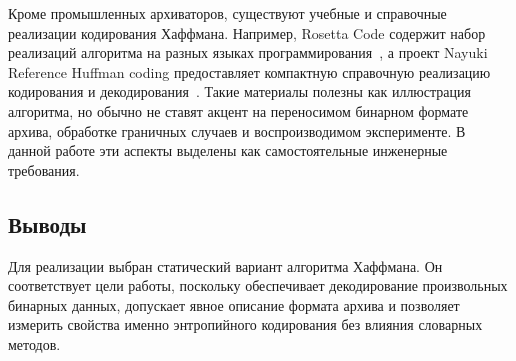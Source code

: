 Кроме промышленных архиваторов, существуют учебные и справочные реализации
кодирования Хаффмана. Например, Rosetta Code содержит набор реализаций
алгоритма на разных языках программирования~\cite{rosettahuffman}, а проект
Nayuki Reference Huffman coding предоставляет компактную справочную реализацию
кодирования и декодирования~\cite{nayukihuffman}. Такие материалы полезны как
иллюстрация алгоритма, но обычно не ставят акцент на переносимом бинарном
формате архива, обработке граничных случаев и воспроизводимом эксперименте. В
данной работе эти аспекты выделены как самостоятельные инженерные требования.

\subsection{Выводы}

Для реализации выбран статический вариант алгоритма Хаффмана. Он соответствует
цели работы, поскольку обеспечивает декодирование произвольных бинарных
данных, допускает явное описание формата архива и позволяет измерить свойства
именно энтропийного кодирования без влияния словарных методов.
